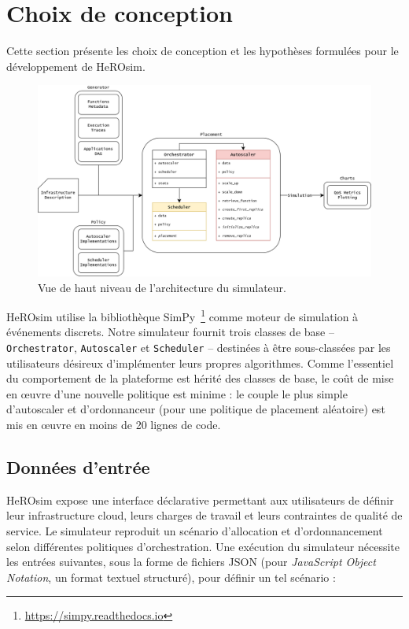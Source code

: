 \section{Choix de conception}
\label{section:herosim-herosim}

Cette section présente les choix de conception et les hypothèses formulées pour le développement de HeROsim.

\begin{figure}[!ht]
    \centering
    \includegraphics[width=\columnwidth]{6_Chapitre6/figures/software-architecture.png}
    \caption{Vue de haut niveau de l'architecture du simulateur.}
\label{figure:herosim-software-architecture}
\end{figure}

HeROsim utilise la bibliothèque SimPy~\footnote{\href{https://simpy.readthedocs.io}{https://simpy.readthedocs.io}} comme moteur de simulation à événements discrets. Notre simulateur fournit trois classes de base -- \texttt{Orchestrator}, \texttt{Autoscaler} et \texttt{Scheduler} -- destinées à être sous-classées par les utilisateurs désireux d'implémenter leurs propres algorithmes. Comme l'essentiel du comportement de la plateforme est hérité des classes de base, le coût de mise en œuvre d'une nouvelle politique est minime : le couple le plus simple d'autoscaler et d'ordonnanceur (pour une politique de placement aléatoire) est mis en œuvre en moins de 20 lignes de code.

\subsection{Données d'entrée}

HeROsim expose une interface déclarative permettant aux utilisateurs de définir leur infrastructure cloud, leurs charges de travail et leurs contraintes de qualité de service. Le simulateur reproduit un scénario d'allocation et d'ordonnancement selon différentes politiques d'orchestration. Une exécution du simulateur nécessite les entrées suivantes, sous la forme de fichiers JSON (pour \textit{JavaScript Object Notation}, un format textuel structuré), pour définir un tel scénario :

